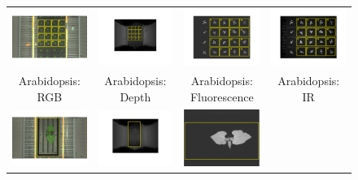 \begin{figure}
\begin{centering}
\begin{tabular}{@{}c c c c}
\includegraphics[width=.23\textwidth]{Figures/FourModalities/A_rgb}&
\includegraphics[width=.23\textwidth]{Figures/FourModalities/A_depth}&
\includegraphics[width=.23\textwidth]{Figures/FourModalities/A_fmp}&
\includegraphics[width=.23\textwidth]{Figures/FourModalities/A_ir}\\
Arabidopsis: RGB &  Arabidopsis: Depth & Arabidopsis: Fluorescence & Arabidopsis: IR \\
\includegraphics[width=.23\textwidth]{Figures/FourModalities/B_rgb}&
\includegraphics[width=.23\textwidth]{Figures/FourModalities/B_depth}&
\includegraphics[width=.23\textwidth]{Figures/FourModalities/B_fmp}&

\end{tabular}
\end{centering}
\end{figure}
